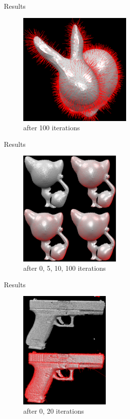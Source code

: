 \documentclass{beamer}
\begin{document}
\begin{frame}{Results}
\begin{figure}[htb]
\centering
\includegraphics[width=0.5\textwidth]{bunny100.PNG}
\caption{after 100 iterations}
\label{fig:prescribed}
\end{figure}
\end{frame}

\begin{frame}{Results}
\begin{figure}[htb]
\centering
\includegraphics[width=0.45\textwidth]{kitten0_5_10_100.PNG}
\caption{after 0, 5, 10, 100 iterations}
\label{fig:prescribed}
\end{figure}
\end{frame}

\begin{frame}{Results}
\begin{figure}[htb]
\centering
\includegraphics[width=0.4\textwidth]{gun_raw_20it.PNG}
\caption{after 0, 20 iterations}
\label{fig:prescribed}
\end{figure}
\end{frame}
\end{document}

